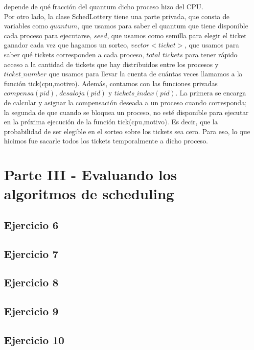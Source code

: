\documentclass[a4paper]{article}
\begin{document}
depende de qu\'e fracci\'on del quantum dicho proceso hizo del CPU. \\
Por otro lado, la clase SchedLottery tiene una parte privada, que consta de variables como $quantum$, 
que usamos para saber el quantum que tiene disponible cada proceso para ejecutarse, $seed$, que
usamos como semilla para elegir el ticket ganador cada vez que hagamos un sorteo, $vector<ticket>$, que
usamos para saber qu\'e tickets corresponden a cada proceso, $total\_tickets$ para tener r\'apido acceso
a la cantidad de tickets que hay distribuidos entre los procesos y $ticket\_number$ que usamos para 
llevar la cuenta de cu\'antas veces llamamos a la funci\'on tick(cpu,motivo). Adem\'as, contamos con 
las funciones privadas $compensa(pid)$, $desaloja(pid)$ y $tickets\_index(pid)$. La primera se encarga de
calcular y asignar la compensaci\'on deseada a un proceso cuando corresponda; la segunda de que cuando
se bloquea un proceso, no est\'e disponible para ejecutar en la pr\'oxima ejecuci\'on de la funci\'on
tick(cpu,motivo). Es decir, que la probabilidad de ser elegible en el sorteo sobre los tickets sea cero.
Para eso, lo que hicimos fue sacarle todos los tickets temporalmente a dicho proceso. \\ 




\section{Parte III - Evaluando los algoritmos de scheduling}

\subsection{Ejercicio 6}
\subsection{Ejercicio 7}
\subsection{Ejercicio 8}
\subsection{Ejercicio 9}
\subsection{Ejercicio 10}
\end{document}
